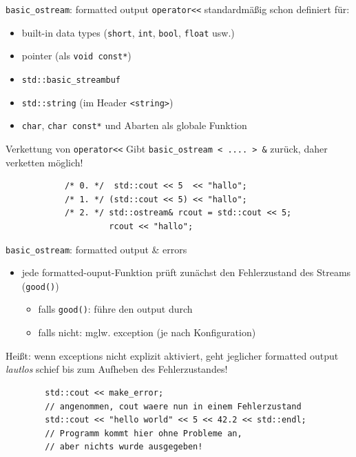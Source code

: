\begin{frame}[fragile]{\texttt{basic\_ostream}: formatted output}
	\texttt{operator<<} standardmäßig schon definiert für:
	\begin{itemize}
		\item built-in data types (\texttt{short}, \texttt{int}, \texttt{bool}, \texttt{float} usw.)
		\item pointer (als \texttt{void const*})
		\item \texttt{std::basic\_streambuf}
		\item \texttt{std::string} (im Header \texttt{<string>})
		\item \texttt{char}, \texttt{char const*} und Abarten als globale Funktion
	\end{itemize}
	
	\pause
	\vspace{0.5em}
	
	\begin{block}{Verkettung von \texttt{operator<<}}
		Gibt \texttt{basic\_ostream < .... > \&} zurück, daher verketten möglich!
		\begin{lstlisting}
			/* 0. */  std::cout << 5  << "hallo";
			/* 1. */ (std::cout << 5) << "hallo";
			/* 2. */ std::ostream& rcout = std::cout << 5;
			         rcout << "hallo";
		\end{lstlisting}
	\end{block}
\end{frame}

\begin{frame}[fragile]{\texttt{basic\_ostream}: formatted output \& errors}
	\begin{itemize}
		\item jede formatted-ouput-Funktion prüft zunächst den Fehlerzustand des Streams (\texttt{good()})
		\begin{itemize}
			\item falls \texttt{good()}: führe den output durch
			\item falls nicht: mglw. exception (je nach Konfiguration)
		\end{itemize}
	\end{itemize}
	
	\pause
	\vspace{2em}
	
	Heißt: wenn exceptions nicht explizit aktiviert, geht jeglicher formatted output \emph{lautlos} schief bis zum Aufheben des Fehlerzustandes!
	
	\begin{lstlisting}
		std::cout << make_error;
		// angenommen, cout waere nun in einem Fehlerzustand
		std::cout << "hello world" << 5 << 42.2 << std::endl;
		// Programm kommt hier ohne Probleme an,
		// aber nichts wurde ausgegeben!
	\end{lstlisting}
\end{frame}

